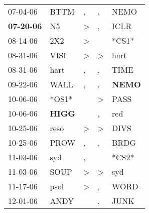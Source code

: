 \begin{supertabular}{p{0.07\textwidth}p{0.06\textwidth}p{0.02\textwidth}p{0.02\textwidth}p{0.06\textwidth}}
          07-04-06\textsuperscript{} &           BTTM\textsuperscript{} &                , &                , &           NEMO\textsuperscript{} \\
 \textbf{07-20-06\textsuperscript{}} &             N5\textsuperscript{} &     \textgreater &                , &           ICLR\textsuperscript{} \\
          08-14-06\textsuperscript{} &            2X2\textsuperscript{} &     \textgreater &                  &                            *CS1* \\
          08-31-06\textsuperscript{} &           VISI\textsuperscript{} &     \textgreater &     \textgreater &           hart\textsuperscript{} \\
          08-31-06\textsuperscript{} &           hart\textsuperscript{} &                , &                , &           TIME\textsuperscript{} \\
          09-22-06\textsuperscript{} &           WALL\textsuperscript{} &                , &                , &  \textbf{NEMO\textsuperscript{}} \\
          10-06-06\textsuperscript{} &                            *OS1* &                  &     \textgreater &           PASS\textsuperscript{} \\
          10-06-06\textsuperscript{} &  \textbf{HIGG\textsuperscript{}} &                  &                , &            red\textsuperscript{} \\
          10-25-06\textsuperscript{} &           reso\textsuperscript{} &     \textgreater &     \textgreater &           DIVS\textsuperscript{} \\
          10-25-06\textsuperscript{} &           PROW\textsuperscript{} &                , &                , &           BRDG\textsuperscript{} \\
          11-03-06\textsuperscript{} &            syd\textsuperscript{} &                , &                  &                            *CS2* \\
          11-03-06\textsuperscript{} &           SOUP\textsuperscript{} &     \textgreater &     \textgreater &            syd\textsuperscript{} \\
          11-17-06\textsuperscript{} &           psol\textsuperscript{} &     \textgreater &                , &           WORD\textsuperscript{} \\
          12-01-06\textsuperscript{} &           ANDY\textsuperscript{} &                  &                , &           JUNK\textsuperscript{} \\

\end{supertabular}
